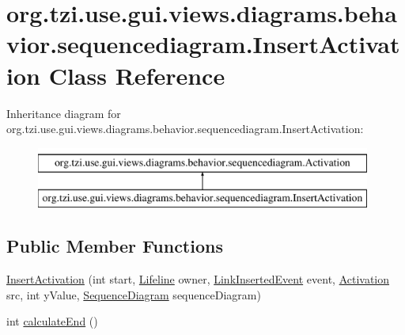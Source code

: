 \hypertarget{classorg_1_1tzi_1_1use_1_1gui_1_1views_1_1diagrams_1_1behavior_1_1sequencediagram_1_1_insert_activation}{\section{org.\-tzi.\-use.\-gui.\-views.\-diagrams.\-behavior.\-sequencediagram.\-Insert\-Activation Class Reference}
\label{classorg_1_1tzi_1_1use_1_1gui_1_1views_1_1diagrams_1_1behavior_1_1sequencediagram_1_1_insert_activation}
}
Inheritance diagram for org.\-tzi.\-use.\-gui.\-views.\-diagrams.\-behavior.\-sequencediagram.\-Insert\-Activation\-:\begin{figure}[H]
\begin{center}
\leavevmode
\includegraphics[height=2.000000cm]{classorg_1_1tzi_1_1use_1_1gui_1_1views_1_1diagrams_1_1behavior_1_1sequencediagram_1_1_insert_activation}
\end{center}
\end{figure}
\subsection*{Public Member Functions}
\begin{DoxyCompactItemize}
\item 
\hyperlink{classorg_1_1tzi_1_1use_1_1gui_1_1views_1_1diagrams_1_1behavior_1_1sequencediagram_1_1_insert_activation_a3f78df358e1268d6c3bd8ddb2edee7d4}{Insert\-Activation} (int start, \hyperlink{classorg_1_1tzi_1_1use_1_1gui_1_1views_1_1diagrams_1_1behavior_1_1sequencediagram_1_1_lifeline}{Lifeline} owner, \hyperlink{classorg_1_1tzi_1_1use_1_1uml_1_1sys_1_1events_1_1_link_inserted_event}{Link\-Inserted\-Event} event, \hyperlink{classorg_1_1tzi_1_1use_1_1gui_1_1views_1_1diagrams_1_1behavior_1_1sequencediagram_1_1_activation}{Activation} src, int y\-Value, \hyperlink{classorg_1_1tzi_1_1use_1_1gui_1_1views_1_1diagrams_1_1behavior_1_1sequencediagram_1_1_sequence_diagram}{Sequence\-Diagram} sequence\-Diagram)
\item 
int \hyperlink{classorg_1_1tzi_1_1use_1_1gui_1_1views_1_1diagrams_1_1behavior_1_1sequencediagram_1_1_insert_activation_a2ca4941602023e021bd9c1bf17bf4ca2}{calculate\-End} ()
\end{DoxyCompactItemize}
